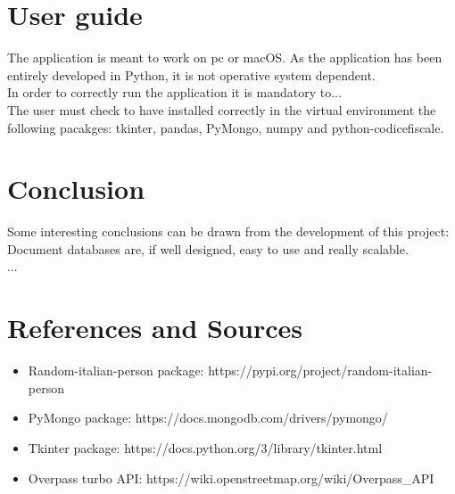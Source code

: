 \documentclass{article}
\begin{document}
\newpage

\section{User guide}
The application is meant to work on pc or macOS. As the application has been entirely developed in Python, it is not
operative system dependent.
\\In order to correctly run the application it is mandatory to...
\\The user must check to have installed correctly in the virtual environment the following pacakges: {\selectfont tkinter, pandas, PyMongo, numpy and python-codicefiscale}.

\section{Conclusion}

Some interesting conclusions can be drawn from the development of this project: Document databases are, if well designed, easy to use and really scalable. \\

...

\section{References and Sources}
\begin{itemize}
    \item Random-italian-person package: https://pypi.org/project/random-italian-person
    \item PyMongo package: https://docs.mongodb.com/drivers/pymongo/
    \item Tkinter package: https://docs.python.org/3/library/tkinter.html
    \item Overpass turbo API: https://wiki.openstreetmap.org/wiki/Overpass\_API
\end{itemize}
\end{document}
